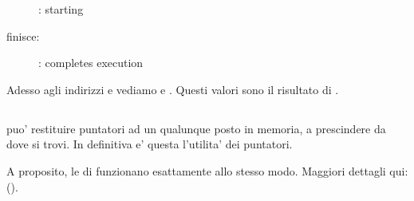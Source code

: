 \begin{figure}[H]
\centering
{}
\caption{\olly: \ttfone starting}
\label{fig:pointers_olly_stk_2}
\end{figure}

\clearpage
\ttfone finisce:

\begin{figure}[H]
\centering
{}
\caption{\olly: \ttfone completes execution}
\label{fig:pointers_olly_stk_3}
\end{figure}

Adesso agli indirizzi  e  vediamo  e .
Questi valori sono il risultato di \ttfone.

\subsection{\Conclusione{}}
 
\ttfone puo' restituire puntatori ad un qualunque posto in memoria, a prescindere da dove si trovi.
In definitiva e' questa l'utilita' dei puntatori.

A proposito, le  di \Cpp funzionano esattamente allo stesso modo.
Maggiori dettagli qui: ().
